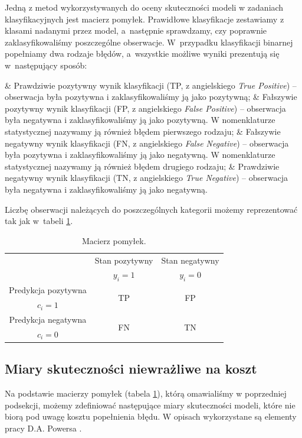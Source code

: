 \documentclass[inzynierska]{pwr_wmat_praca_dyplomowa}
\theoremstyle{plain}
\numberwithin{theorem}{chapter}
\theoremstyle{definition}
\numberwithin{theorem}{chapter}
\begin{document}
Jedną z metod wykorzystywanych do oceny skuteczności modeli w zadaniach klasyfikacyjnych jest macierz pomyłek. Prawidłowe klasyfikacje zestawiamy z klasami nadanymi przez model, a~następnie sprawdzamy, czy poprawnie zaklasyfikowaliśmy poszczególne obserwacje. W~przypadku klasyfikacji binarnej popełniamy dwa rodzaje błędów, a~wszystkie możliwe wyniki prezentują się w~następujący sposób:
\begin{myitemize}
	& Prawdziwie pozytywny wynik klasyfikacji (TP, z angielskiego \textit{True Positive}) -- obserwacja była pozytywna i zaklasyfikowaliśmy ją jako pozytywną;
	& Fałszywie pozytywny wynik klasyfikacji (FP, z angielskiego \textit{False Positive}) -- obserwacja była negatywna i zaklasyfikowaliśmy ją jako pozytywną. W nomenklaturze statystycznej nazywamy ją również błędem pierwszego rodzaju;
	& Fałszywie negatywny wynik klasyfikacji (FN, z angielskiego \textit{False Negative}) -- obserwacja była pozytywna i zaklasyfikowaliśmy ją jako negatywną. W nomenklaturze statystycznej nazywamy ją również błędem drugiego rodzaju;
	& Prawdziwie negatywny wynik klasyfikacji (TN, z angielskiego \textit{True Negative}) -- obserwacja była negatywna i zaklasyfikowaliśmy ją jako negatywną.
\end{myitemize}
\noindent Liczbę obserwacji należących do poszczególnych kategorii możemy reprezentować tak jak w~tabeli \ref{tab:macierz-pomylek}.
\begin{table}[h]
	\begin{center}
		\begin{tabular}{c|c|c}
			 \multirow{2}{4em}{} & Stan pozytywny & Stan negatywny \\
			                  & $y_i = 1$            & $y_i = 0$ \\
			 \hline
			  Predykcja pozytywna & \multirow{2}{4em}{\centering TP} & \multirow{2}{4em}{\centering FP} \\
			    $c_i = 1$         &                    &                    \\
			 \hline
			 Predykcja negatywna & \multirow{2}{4em}{\centering FN} & \multirow{2}{4em}{\centering TN} \\
			   $c_i = 0$         &                    &                    \\
		\end{tabular}
	\end{center}
	\caption{Macierz pomyłek.}
	\label{tab:macierz-pomylek}
\end{table}

\subsection{Miary skuteczności niewrażliwe na koszt}
Na podstawie macierzy pomyłek (tabela \ref{tab:macierz-pomylek}), którą omawialiśmy w poprzedniej podsekcji, możemy zdefiniować następujące miary skuteczności modeli, które nie biorą pod uwagę kosztu popełnienia błędu. W opisach wykorzystane są elementy pracy D.A. Powersa \cite{evaluation_metrics}.
\end{document}
